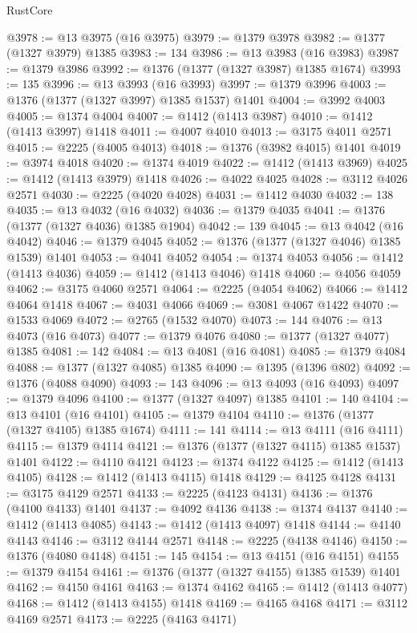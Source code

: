 \begin{lexlean}{RustCore}
\begin{coremodule}
@3978 := @13 @3975 (@16 @3975)
@3979 := @1379 @3978
@3982 := @1377 (@1327 @3979) @1385
@3983 := 134
@3986 := @13 @3983 (@16 @3983)
@3987 := @1379 @3986
@3992 := @1376 (@1377 (@1327 @3987) @1385 @1674)
@3993 := 135
@3996 := @13 @3993 (@16 @3993)
@3997 := @1379 @3996
@4003 := @1376 (@1377 (@1327 @3997) @1385 @1537) @1401
@4004 := @3992 @4003
@4005 := @1374 @4004
@4007 := @1412 (@1413 @3987)
@4010 := @1412 (@1413 @3997) @1418
@4011 := @4007 @4010
@4013 := @3175 @4011 @2571
@4015 := @2225 (@4005 @4013)
@4018 := @1376 (@3982 @4015) @1401
@4019 := @3974 @4018
@4020 := @1374 @4019
@4022 := @1412 (@1413 @3969)
@4025 := @1412 (@1413 @3979) @1418
@4026 := @4022 @4025
@4028 := @3112 @4026 @2571
@4030 := @2225 (@4020 @4028)
@4031 := @1412 @4030
@4032 := 138
@4035 := @13 @4032 (@16 @4032)
@4036 := @1379 @4035
@4041 := @1376 (@1377 (@1327 @4036) @1385 @1904)
@4042 := 139
@4045 := @13 @4042 (@16 @4042)
@4046 := @1379 @4045
@4052 := @1376 (@1377 (@1327 @4046) @1385 @1539) @1401
@4053 := @4041 @4052
@4054 := @1374 @4053
@4056 := @1412 (@1413 @4036)
@4059 := @1412 (@1413 @4046) @1418
@4060 := @4056 @4059
@4062 := @3175 @4060 @2571
@4064 := @2225 (@4054 @4062)
@4066 := @1412 @4064 @1418
@4067 := @4031 @4066
@4069 := @3081 @4067 @1422
@4070 := @1533 @4069
@4072 := @2765 (@1532 @4070)
@4073 := 144
@4076 := @13 @4073 (@16 @4073)
@4077 := @1379 @4076
@4080 := @1377 (@1327 @4077) @1385
@4081 := 142
@4084 := @13 @4081 (@16 @4081)
@4085 := @1379 @4084
@4088 := @1377 (@1327 @4085) @1385
@4090 := @1395 (@1396 @802)
@4092 := @1376 (@4088 @4090)
@4093 := 143
@4096 := @13 @4093 (@16 @4093)
@4097 := @1379 @4096
@4100 := @1377 (@1327 @4097) @1385
@4101 := 140
@4104 := @13 @4101 (@16 @4101)
@4105 := @1379 @4104
@4110 := @1376 (@1377 (@1327 @4105) @1385 @1674)
@4111 := 141
@4114 := @13 @4111 (@16 @4111)
@4115 := @1379 @4114
@4121 := @1376 (@1377 (@1327 @4115) @1385 @1537) @1401
@4122 := @4110 @4121
@4123 := @1374 @4122
@4125 := @1412 (@1413 @4105)
@4128 := @1412 (@1413 @4115) @1418
@4129 := @4125 @4128
@4131 := @3175 @4129 @2571
@4133 := @2225 (@4123 @4131)
@4136 := @1376 (@4100 @4133) @1401
@4137 := @4092 @4136
@4138 := @1374 @4137
@4140 := @1412 (@1413 @4085)
@4143 := @1412 (@1413 @4097) @1418
@4144 := @4140 @4143
@4146 := @3112 @4144 @2571
@4148 := @2225 (@4138 @4146)
@4150 := @1376 (@4080 @4148)
@4151 := 145
@4154 := @13 @4151 (@16 @4151)
@4155 := @1379 @4154
@4161 := @1376 (@1377 (@1327 @4155) @1385 @1539) @1401
@4162 := @4150 @4161
@4163 := @1374 @4162
@4165 := @1412 (@1413 @4077)
@4168 := @1412 (@1413 @4155) @1418
@4169 := @4165 @4168
@4171 := @3112 @4169 @2571
@4173 := @2225 (@4163 @4171)

\end{coremodule}
\end{lexlean}
